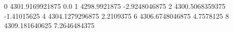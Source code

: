 0 4301.9169921875 0.0
1 4298.9921875 -2.9248046875
2 4300.5068359375 -1.41015625
4 4304.1279296875 2.2109375
6 4306.6748046875 4.7578125
8 4309.181640625 7.2646484375
